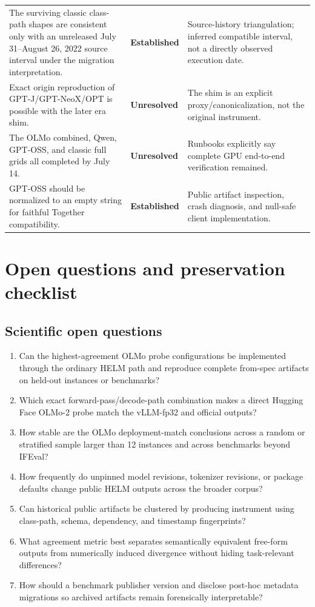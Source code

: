 \documentclass[11pt,oneside]{report}
\newcommand{\code}[1]{\texttt{\detokenize{#1}}}
\newcommand{\statusEstablished}{\textcolor{established}{\textbf{Established}}\xspace}
\newcommand{\statusUnresolved}{\textcolor{unresolved}{\textbf{Unresolved}}\xspace}
\begin{document}
\begin{longtable}{@{}P{0.31\textwidth}P{0.18\textwidth}P{0.41\textwidth}@{}}
The surviving classic class-path shapes are consistent only with an unreleased July 31--August 26, 2022 source interval under the migration interpretation. & \statusEstablished & Source-history triangulation; inferred compatible interval, not a directly observed execution date. \\
Exact origin reproduction of GPT-J/GPT-NeoX/OPT is possible with the later era shim. & \statusUnresolved & The shim is an explicit proxy/canonicalization, not the original instrument. \\
The OLMo combined, Qwen, GPT-OSS, and classic full grids all completed by July 14. & \statusUnresolved & Runbooks explicitly say complete GPU end-to-end verification remained. \\
GPT-OSS \code{content=null} should be normalized to an empty string for faithful Together compatibility. & \statusEstablished & Public artifact inspection, crash diagnosis, and null-safe client implementation. \\
\bottomrule
\end{longtable}

\chapter{Open questions and preservation checklist}

\section{Scientific open questions}

\begin{enumerate}
  \item Can the highest-agreement OLMo probe configurations be implemented through the ordinary HELM path and reproduce complete from-spec artifacts on held-out instances or benchmarks?
  \item Which exact forward-pass/decode-path combination makes a direct Hugging Face OLMo-2 probe match the vLLM-fp32 and official outputs?
  \item How stable are the OLMo deployment-match conclusions across a random or stratified sample larger than 12 instances and across benchmarks beyond IFEval?
  \item How frequently do unpinned model revisions, tokenizer revisions, or package defaults change public HELM outputs across the broader corpus?
  \item Can historical public artifacts be clustered by producing instrument using class-path, schema, dependency, and timestamp fingerprints?
  \item What agreement metric best separates semantically equivalent free-form outputs from numerically induced divergence without hiding task-relevant differences?
  \item How should a benchmark publisher version and disclose post-hoc metadata migrations so archived artifacts remain forensically interpretable?
\end{enumerate}
\end{document}
